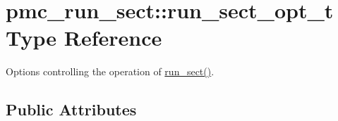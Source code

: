 \hypertarget{structpmc__run__sect_1_1run__sect__opt__t}{}\section{pmc\+\_\+run\+\_\+sect\+:\+:run\+\_\+sect\+\_\+opt\+\_\+t Type Reference}
\label{structpmc__run__sect_1_1run__sect__opt__t}


Options controlling the operation of \mbox{\hyperlink{namespacepmc__run__sect_a98f7b8811139683010e8a70346452ac2}{run\+\_\+sect()}}.  


\subsection*{Public Attributes}
